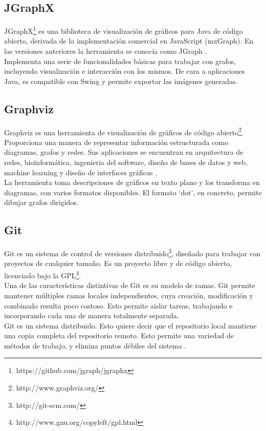 \subsection{JGraphX}
JGraphX\footnote{https://github.com/jgraph/jgraphx} es una biblioteca de visualización de gráficos para Java de código abierto, derivada de la implementación comercial en JavaScript (mxGraph).
En las versiones anteriores la herramienta se conocía como JGraph \cite{website:jgraphx}.
\\
Implementa una serie de funcionalidades básicas para trabajar con grafos, incluyendo visualización e interacción con los mismos.
De cara a aplicaciones Java, es compatible con Swing y permite exportar las imágenes generadas.

\subsection{Graphviz}
Graphviz es una herramienta de visualización de gráficos de código abierto\footnote{http://www.graphviz.org/}.
Proporciona una manera de representar información estructurada como diagramas, grafos y redes.
Sus aplicaciones se encuentran en arquitectura de redes, bioinformática, ingenieria del software, diseño de bases de datos y web, machine learning y diseño de interfaces gráficas \cite{website:graphviz}.
\\
La herramienta toma descripciones de gráficos en texto plano y los transforma en diagramas, con varios formatos disponibles.
El formato `dot', en concreto, permite dibujar grafos dirigidos.

\subsection{Git}
Git es un sistema de control de versiones distribuido\footnote{http://git-scm.com/}, diseñado para trabajar con proyectos de cualquier tamaño.
Es un proyecto libre y de código abierto, licenciado bajo la GPL\footnote{http://www.gnu.org/copyleft/gpl.html}.
\\
Una de las características distintivas de Git es su modelo de ramas.
Git permite mantener múltiples ramas locales independientes, cuya creación, modificación y combinado resulta poco costoso.
Esto permite aislar tareas, trabajando e incorporando cada una de manera totalmente separada.
\\
Git es un sistema distribuido.
Esto quiere decir que el repositorio local mantiene una copia completa del repositorio remoto.
Esto permite una variedad de métodos de trabajo, y elimina puntos débiles del sistema \cite{website:git}.

